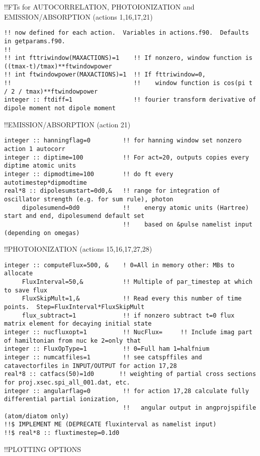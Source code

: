 !!{\large \quad FTs for AUTOCORRELATION, PHOTOIONIZATION and EMISSION/ABSORPTION (actions 1,16,17,21)}
\begin{verbatim}
!! now defined for each action.  Variables in actions.f90.  Defaults in getparams.f90.
!!
!! int fttriwindow(MAXACTIONS)=1    !! If nonzero, window function is ((tmax-t)/tmax)**ftwindowpower
!! int ftwindowpower(MAXACTIONS)=1  !! If fttriwindow=0, 
!!                                  !!    window function is cos(pi t / 2 / tmax)**ftwindowpower 
integer :: ftdiff=1                 !! fourier transform derivative of dipole moment not dipole moment
\end{verbatim}
!!{\large \quad EMISSION/ABSORPTION (action 21)}
\begin{verbatim}
integer :: hanningflag=0         !! for hanning window set nonzero action 1 autocorr
integer :: diptime=100           !! For act=20, outputs copies every diptime atomic units
integer :: dipmodtime=100        !! do ft every autotimestep*dipmodtime
real*8 :: dipolesumstart=0d0,&   !! range for integration of oscillator strength (e.g. for sum rule), photon
     dipolesumend=0d0            !!    energy atomic units (Hartree) start and end, dipolesumend default set
                                 !!    based on &pulse namelist input (depending on omegas)
\end{verbatim}
!!{\large \quad PHOTOIONIZATION (actions 15,16,17,27,28)}
\begin{verbatim}
integer :: computeFlux=500, &    ! 0=All in memory other: MBs to allocate
     FluxInterval=50,&           !! Multiple of par_timestep at which to save flux
     FluxSkipMult=1,&            !! Read every this number of time points.  Step=FluxInterval*FluxSkipMult
     flux_subtract=1             !! if nonzero subtract t=0 flux matrix element for decaying initial state
integer :: nucfluxopt=1          !! NucFlux=     !! Include imag part of hamiltonian from nuc ke 2=only that
integer :: FluxOpType=1          !! 0=Full ham 1=halfnium 
integer :: numcatfiles=1         !! see catspffiles and catavectorfiles in INPUT/OUTPUT for action 17,28
real*8 :: catfacs(50)=1d0       !! weighting of partial cross sections for proj.xsec.spi_all_001.dat, etc.
integer :: angularflag=0         !! for action 17,28 calculate fully differential partial ionization,
                                 !!   angular output in angprojspifile (atom/diatom only)
!!$ IMPLEMENT ME (DEPRECATE fluxinterval as namelist input) 
!!$ real*8 :: fluxtimestep=0.1d0
\end{verbatim}
!!{\large \quad PLOTTING OPTIONS }
